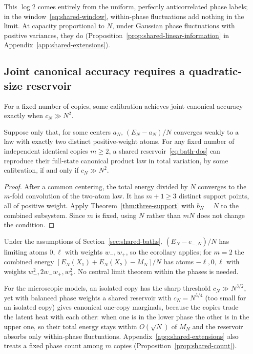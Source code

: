 This $\log2$ comes entirely from the uniform, perfectly anticorrelated
phase labels; in the window~\eqref{eq:shared-window}, within-phase
fluctuations add nothing in the limit. At capacity proportional to
$N$, under Gaussian phase fluctuations with positive variances, they
do (Proposition~\ref{prop:shared-linear-information} in
Appendix~\ref{app:shared-extensions}).

\subsection{Joint canonical accuracy requires a quadratic-size reservoir}

For a fixed number of copies, some calibration achieves joint
canonical accuracy exactly when $c_N\gg N^2$.

\begin{corollary}
\label{cor:shared-joint-threshold}
Suppose only that, for some centers $a_N$, $(E_N-a_N)/N$ converges
weakly to a law with exactly two distinct positive-weight atoms.
For any fixed number of
independent identical copies $m\ge2$, a shared
reservoir~\eqref{eq:bath-dos} can reproduce their full-state canonical
product law in total variation,
by some calibration, if and only if $c_N\gg N^2$.
\end{corollary}
\begin{proof}
After a common centering, the total energy divided by $N$ converges
to the $m$-fold convolution of the two-atom law. It has $m+1\ge3$
distinct support points, all of positive weight. Apply
Theorem~\ref{thm:three-support} with $b_N=N$ to the combined subsystem.
Since $m$ is fixed, using $N$ rather than $mN$ does not change the
condition.
\end{proof}

Under the assumptions of Section~\ref{sec:shared-baths},
$(E_N-e_{-,N})/N$ has limiting atoms $0,\ell$ with weights $w_-,w_+$,
so the corollary applies; for $m=2$ the combined energy
$[E_N(X_1)+E_N(X_2)-M_N]/N$ has atoms $-\ell,0,\ell$ with weights
$w_-^2,2w_-w_+,w_+^2$. No central limit theorem within the phases is
needed.

For the microscopic models, an isolated copy has the sharp threshold
$c_N\gg N^{3/2}$, yet with balanced phase weights a shared reservoir
with $c_N=N^{5/4}$ (too small for an isolated copy) gives canonical
one-copy marginals, because the copies trade the latent heat with
each other: when one is in the lower phase the other is in the upper
one, so their total energy stays within $O(\sqrt N)$ of $M_N$ and the
reservoir absorbs only within-phase fluctuations.
Appendix~\ref{app:shared-extensions} also treats a fixed phase count
among $m$ copies (Proposition~\ref{prop:shared-count}).

